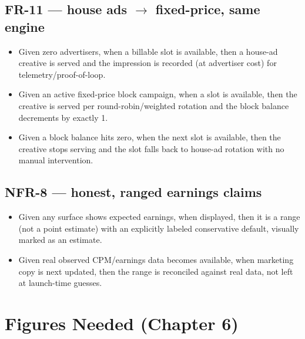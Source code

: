 \subsection*{FR-11 --- house ads $\to$ fixed-price, same engine}
\begin{itemize}
\item Given zero advertisers, when a billable slot is available, then a house-ad creative is served and the impression is recorded (at  advertiser cost) for telemetry/proof-of-loop.
\item Given an active fixed-price block campaign, when a slot is available, then the creative is served per round-robin/weighted rotation and the block balance decrements by exactly 1.
\item Given a block balance hits zero, when the next slot is available, then the creative stops serving and the slot falls back to house-ad rotation with no manual intervention.
\end{itemize}

\subsection*{NFR-8 --- honest, ranged earnings claims}
\begin{itemize}
\item Given any surface shows expected earnings, when displayed, then it is a range (not a point estimate) with an explicitly labeled conservative default, visually marked as an estimate.
\item Given real observed CPM/earnings data becomes available, when marketing copy is next updated, then the range is reconciled against real data, not left at launch-time guesses.
\end{itemize}

\section{Figures Needed (Chapter 6)}
\label{sec:ch6-figures}

